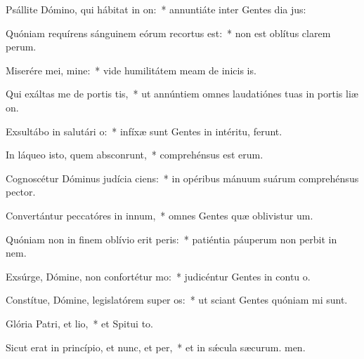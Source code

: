 \item Psállite Dómino, qui hábitat in on:~* annuntiáte inter Gentes dia jus:
\item Quóniam requírens sánguinem eórum recortus est:~* non est oblítus clarem perum.
\item Miserére mei, mine:~* vide humilitátem meam de inicis is.
\item Qui exáltas me de portis tis,~* ut annúntiem omnes laudatiónes tuas in portis liæ on.
\item Exsultábo in salutári o:~* infíxæ sunt Gentes in intéritu,  ferunt.
\item In láqueo isto, quem absconrunt,~* comprehénsus est  erum.
\item Cognoscétur Dóminus judícia ciens:~* in opéribus mánuum suárum comprehénsus  pector.
\item Convertántur peccatóres in innum,~* omnes Gentes quæ oblivistur um.
\item Quóniam non in finem oblívio erit peris:~* patiéntia páuperum non perbit in nem.
\item Exsúrge, Dómine, non confortétur mo:~* judicéntur Gentes in contu o.
\item Constítue, Dómine, legislatórem super os:~* ut sciant Gentes quóniam mi sunt.
\item Glória Patri, et lio,~* et Spitui to.
\item Sicut erat in princípio, et nunc, et per,~* et in sǽcula sæcurum. men.

